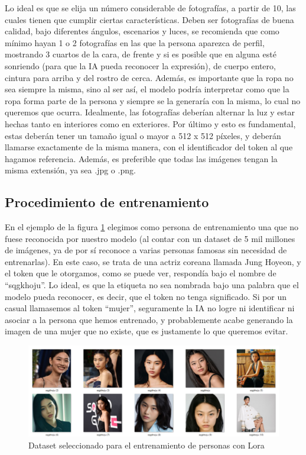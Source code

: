 Lo ideal es que se elija un número considerable de fotografías, a partir de 10, las cuales tienen que cumplir ciertas características. Deben ser fotografías de buena calidad, bajo diferentes ángulos, escenarios y luces, se recomienda que como mínimo hayan 1 o 2 fotografías en las que la persona aparezca de perfil, mostrando 3 cuartos de la cara, de frente y si es posible que en alguna esté sonriendo (para que la IA pueda reconocer la expresión), de cuerpo entero, cintura para arriba y del rostro de cerca. Además, es importante que la ropa no sea siempre la misma, sino al ser así, el modelo podría interpretar como que la ropa forma parte de la persona y siempre se la generaría con la misma, lo cual no queremos que ocurra. Idealmente, las fotografías deberían alternar la luz y estar hechas tanto en interiores como en exteriores. Por último y esto es fundamental, estas deberán tener un tamaño igual o mayor a 512 x 512 píxeles, y deberán llamarse exactamente de la misma manera, con el identificador del token al que hagamos referencia. Además, es preferible que todas las imágenes tengan la misma extensión, ya sea .jpg o .png. 

\subsection{Procedimiento de entrenamiento}

En el ejemplo de la figura \ref{fig:datasethoyeon}  elegimos como persona de entrenamiento una que no fuese reconocida por nuestro modelo (al contar con un dataset de 5 mil millones de imágenes, ya de por sí reconoce a varias personas famosas sin necesidad de entrenarlas). En este caso, se trata de una actriz coreana llamada Jung Hoyeon, y el token que le otorgamos, como se puede ver, respondía bajo el nombre de ``sqgkhoju''. Lo ideal, es que la etiqueta no sea nombrada bajo una palabra que el modelo pueda reconocer, es decir, que el token no tenga significado. Si por un casual llamasemos al token ``mujer'', seguramente la IA no logre ni identificar ni asociar a la persona que hemos entrenado, y probablemente acabe generando la imagen de una mujer que no existe, que es justamente lo que queremos evitar. \\

\begin{figure}[h]
	\centering
	\includegraphics[width = 1
	\textwidth]{Imagenes/Vectorial/datasethoyeon.png}
	\caption{Dataset seleccionado para el entrenamiento de personas con Lora}
	\label{fig:datasethoyeon}
\end{figure}

